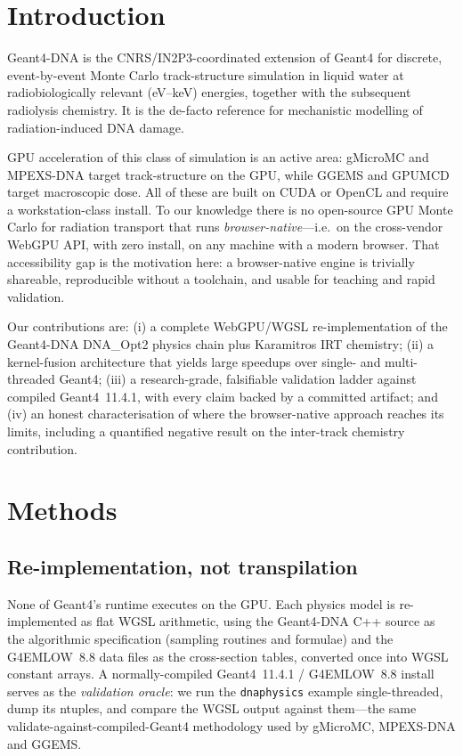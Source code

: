 \documentclass[11pt]{article}
\begin{document}
\section{Introduction}
Geant4-DNA \cite{incerti2010geant4dna,bernal2015track,incerti2018geant4dna} is
the CNRS/IN2P3-coordinated extension of Geant4 \cite{agostinelli2003geant4}
for discrete, event-by-event Monte Carlo track-structure simulation in liquid
water at radiobiologically relevant (\si{eV}--\si{keV}) energies, together
with the subsequent radiolysis chemistry. It is the de-facto reference for
mechanistic modelling of radiation-induced DNA damage.

GPU acceleration of this class of simulation is an active area: gMicroMC
\cite{tsai2020gmicromc} and MPEXS-DNA \cite{okada2019mpexs} target
track-structure on the GPU, while GGEMS \cite{ggems} and GPUMCD
\cite{hissoiny2011gpumcd} target macroscopic dose. All of these are built on
CUDA or OpenCL and require a workstation-class install. To our knowledge there
is no open-source GPU Monte Carlo for radiation transport that runs
\emph{browser-native}---i.e.\ on the cross-vendor WebGPU API, with zero
install, on any machine with a modern browser. That accessibility gap is the
motivation here: a browser-native engine is trivially shareable, reproducible
without a toolchain, and usable for teaching and rapid validation.

Our contributions are: (i) a complete WebGPU/WGSL re-implementation of the
Geant4-DNA DNA\_Opt2 physics chain plus Karamitros IRT chemistry; (ii) a
kernel-fusion architecture that yields large speedups over single- and
multi-threaded Geant4; (iii) a research-grade, falsifiable validation ladder
against compiled Geant4~11.4.1, with every claim backed by a committed
artifact; and (iv) an honest characterisation of where the browser-native
approach reaches its limits, including a quantified negative result on the
inter-track chemistry contribution.

\section{Methods}

\subsection{Re-implementation, not transpilation}
None of Geant4's runtime executes on the GPU. Each physics model is
re-implemented as flat WGSL arithmetic, using the Geant4-DNA C++ source as the
algorithmic specification (sampling routines and formulae) and the
G4EMLOW~8.8 data files as the cross-section tables, converted once into WGSL
constant arrays. A normally-compiled Geant4~11.4.1 / G4EMLOW~8.8 install
serves as the \emph{validation oracle}: we run the \texttt{dnaphysics}
example single-threaded, dump its ntuples, and compare the WGSL output against
them---the same validate-against-compiled-Geant4 methodology used by
gMicroMC, MPEXS-DNA and GGEMS.
\end{document}
